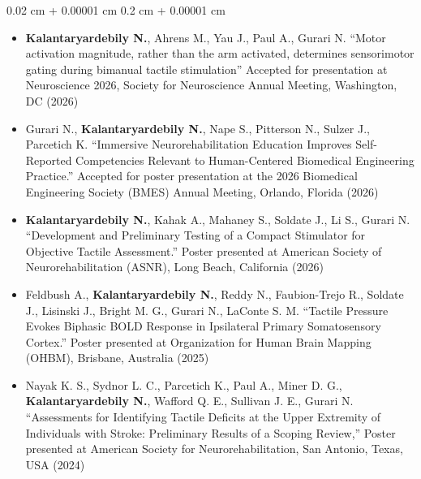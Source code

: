\documentclass[10pt, letterpaper]{article}
\newenvironment{highlights}{
    \begin{itemize}[
        topsep=0.10 cm,
        parsep=0.10 cm,
        partopsep=0pt,
        itemsep=0pt,
        leftmargin=0.2 cm + 10pt
    ]
}{
    \end{itemize}
} %
\newenvironment{onecolentry}{
    \begin{adjustwidth}{
        0.02 cm + 0.00001 cm
    }{
        0.2 cm + 0.00001 cm
    }
}{
    \end{adjustwidth}
} %
\begin{document}
\begin{onecolentry}
\begin{highlights}
\textbf{--------------------------------------------------------- Peer-Reviewed Abstract Publications ----------------------------------------------------------}

\item \textbf{Kalantaryardebily N.}, Ahrens M., Yau J., Paul A., Gurari N. ``Motor activation magnitude, rather than the arm activated, determines sensorimotor gating during bimanual tactile stimulation'' Accepted for presentation at Neuroscience 2026, Society for Neuroscience Annual Meeting, Washington, DC (2026)

\item Gurari N., \textbf{Kalantaryardebily N.}, Nape S., Pitterson N., Sulzer J., Parcetich K. ``Immersive Neurorehabilitation Education Improves Self-Reported Competencies Relevant to Human-Centered Biomedical Engineering Practice.'' Accepted for poster presentation at the 2026 Biomedical Engineering Society (BMES) Annual Meeting, Orlando, Florida (2026)

\item \textbf{Kalantaryardebily N.}, Kahak A., Mahaney S., Soldate J., Li S., Gurari N. ``Development and Preliminary Testing of a Compact Stimulator for Objective Tactile Assessment.'' Poster presented at American Society of Neurorehabilitation (ASNR), Long Beach, California (2026)

\item Feldbush A., \textbf{Kalantaryardebily N.}, Reddy N., Faubion-Trejo R., Soldate J., Lisinski J., Bright M. G., Gurari N., LaConte S. M. ``Tactile Pressure Evokes Biphasic BOLD Response in Ipsilateral Primary Somatosensory Cortex.'' Poster presented at Organization for Human Brain Mapping (OHBM), Brisbane, Australia (2025)
\item Nayak K. S., Sydnor L. C., Parcetich K., Paul A., Miner D. G., \textbf{Kalantaryardebily N.}, Wafford Q. E., Sullivan J. E., Gurari N. ``Assessments for Identifying Tactile Deficits at the Upper Extremity of Individuals with Stroke: Preliminary Results of a Scoping Review,'' Poster presented at American Society for Neurorehabilitation, San Antonio, Texas, USA (2024)


\end{highlights}
\end{onecolentry}
\end{document}
